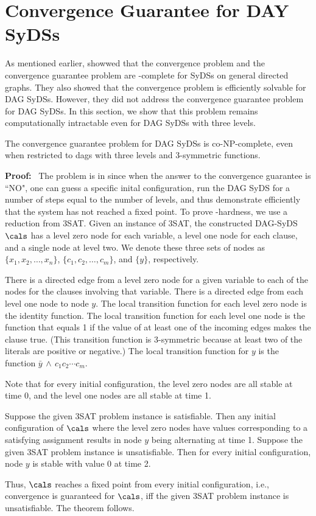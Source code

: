 \section{Convergence Guarantee for DAY SyDSs}
\label{sec:conv_guarantee}

As mentioned earlier, \cite{Chistikov-etal-2020}
showwed that the convergence problem and the convergence
guarantee problem are \psp-complete for SyDSs on general directed
graphs.
They also showed that the convergence problem is efficiently
solvable for DAG SyDSs.
However, they did not address the convergence guarantee problem
for DAG SyDSs.
In this section, we show that this problem 
remains computationally intractable even for
DAG SyDSs with three levels.

\begin{theorem}\label{thm:convergence_guaranee}
The convergence guarantee problem for DAG SyDSs is co-NP-complete,
even when restricted to dags with three levels and 3-symmetric functions.
\end{theorem}

\noindent
\textbf{Proof:}~ The problem is in \conp{} since when the answer to the
convergence guarantee is ``NO", one can guess a specific inital configuration,
run the DAG SyDS for a number of steps equal to the number of levels, and
thus demonstrate efficiently that the system has not reached a fixed point.
To prove \cnp-hardness, we use a reduction from 3SAT.
Given an instance of 3SAT,
the constructed DAG-SyDS $\cals$ has a level zero node for each variable, 
a level one node for each clause, and a single node at level two.
We denote these three sets of nodes as $\{x_1, x_2, \ldots , x_n\}$,
$\{c_1,c_2, \ldots , c_m\}$, and $\{y\}$, respectively.

There is a directed edge from a  level zero node for a given variable
to each of  the nodes for the clauses involving that variable.
There is a directed edge from each level one node to node $y$.  The
local transition function for each level zero node is the identity
function.  The local transition function for each level one node
is the function that equals 1
if the value of at least one of the incoming edges
makes the clause true.  (This transition function is 3-symmetric
because at least two of the literals are positive or negative.) The
local transition function for $y$ is the function 
$\bar{y} \, \wedge \, c_1 c_2 \cdots  c_{m}$.

Note that for every initial configuration, the level zero nodes are
all stable at time 0, and the level one nodes are all stable at
time 1.

Suppose the given 3SAT problem instance is satisfiable.
Then any initial configuration of $\cals$ where the level zero nodes 
have values corresponding to a satisfying assignment
results in node $y$ being alternating at time 1.
Suppose the given 3SAT problem instance is unsatisfiable.
Then for every initial configuration, node $y$ is stable with value 0 at time 2.

\smallskip
Thus, $\cals$ reaches a fixed point from every initial configuration, 
i.e.,  convergence is guaranteed for $\cals$,
iff the given 3SAT problem instance is unsatisfiable.
The theorem follows.
\QED

